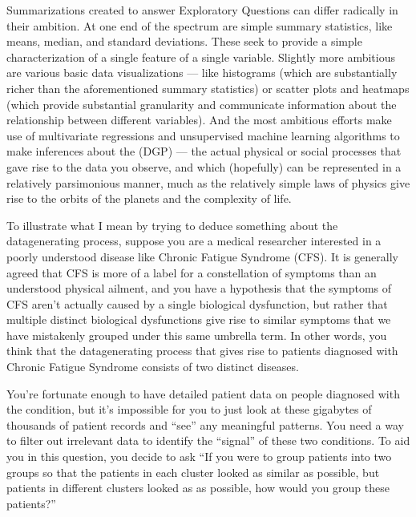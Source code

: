 \documentclass[letterpaper,10pt,english]{jupyterBook}
\begin{document}
\sphinxAtStartPar
Summarizations created to answer Exploratory Questions can differ radically in their ambition. At one end of the spectrum are simple summary statistics, like means, median, and standard deviations. These seek to provide a simple characterization of a single feature of a single variable. Slightly more ambitious are various basic data visualizations — like histograms (which are substantially richer than the aforementioned summary statistics) or scatter plots and heatmaps (which provide substantial granularity and communicate information about the relationship between different variables). And the most ambitious efforts make use of multivariate regressions and unsupervised machine learning algorithms to make inferences about the  (DGP) — the actual physical or social processes that gave rise to the data you observe, and which (hopefully) can be represented in a relatively parsimonious manner, much as the relatively simple laws of physics give rise to the orbits of the planets and the complexity of life.

\sphinxAtStartPar
To illustrate what I mean by trying to deduce something about the data\sphinxhyphen{}generating process, suppose you are a medical researcher interested in a poorly understood disease like Chronic Fatigue Syndrome (CFS). It is generally agreed that CFS is more of a label for a constellation of symptoms than an understood physical ailment, and you have a hypothesis that the symptoms of CFS aren’t actually caused by a single biological dysfunction, but rather that multiple distinct biological dysfunctions give rise to similar symptoms that we have mistakenly grouped under this same umbrella term. In other words, you think that the data\sphinxhyphen{}generating process that gives rise to patients diagnosed with Chronic Fatigue Syndrome consists of two distinct diseases.

\sphinxAtStartPar
You’re fortunate enough to have detailed patient data on people diagnosed with the condition, but it’s impossible for you to just look at these gigabytes of thousands of patient records and “see” any meaningful patterns. You need a way to filter out irrelevant data to identify the “signal” of these two conditions. To aid you in this question, you decide to ask “If you were to group patients into two groups so that the patients in each cluster looked as similar as possible, but patients in different clusters looked as  as possible, how would you group these patients?”
\end{document}
